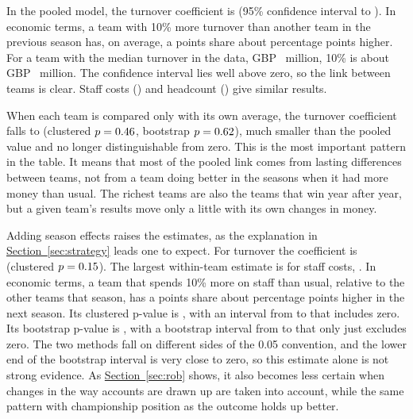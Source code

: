 \documentclass[11pt,a4paper]{article}
\begin{document}
In the pooled model, the turnover coefficient is \CoefTurnPooled{}
(95\% confidence interval \CiLowTurnPooled{} to \CiHighTurnPooled). In economic terms, a team with 10\% more turnover than
another team in the previous season has, on average, a points share about \PpTurnPooled{} percentage points higher. For a
team with the median turnover in the data, GBP~\MedTurnM{} million, 10\% is about GBP~\TenPctTurnM{} million.
The confidence interval lies well above zero, so the link between teams is clear. Staff costs (\CoefStaffPooled) and
headcount (\CoefHeadPooled) give similar results.

When each team is compared only with its own average,
the turnover coefficient falls to \CoefTurnFe{} (clustered $p = 0.46$, bootstrap $p = 0.62$), much smaller than
the pooled value and no longer distinguishable from zero. This is the most important pattern in the table. It
means that most of the pooled link comes from lasting differences between teams, not from a team doing better in the
seasons when it had more money than usual. The richest teams are also the teams that win year after year, but a given
team's results move only a little with its own changes in money.

Adding season effects raises the estimates, as the
explanation in \hyperref[sec:strategy]{Section~\ref*{sec:strategy}} leads one to expect. For turnover the coefficient is
\CoefTurnTwfe{} (clustered $p = 0.15$). The largest within-team estimate is for staff costs, \CoefStaffTwfe. In
economic terms, a team that spends 10\% more on staff than usual, relative to the other teams that season, has a points
share about \PpStaffTwfe{} percentage points higher in the next season. Its clustered p-value is \PStaffTwfe{}, with an interval from \CiLowStaffTwfe{} to \CiHighStaffTwfe{} that includes zero.
Its bootstrap p-value is \PwildStaffTwfe{}, with a bootstrap interval from \CiBootLowStaffTwfe{} to \CiBootHighStaffTwfe{}
that only just excludes zero. The two methods fall on different sides of the 0.05 convention, and the lower end of the
bootstrap interval is very close to zero, so this estimate alone is not strong evidence. As
\hyperref[sec:rob]{Section~\ref*{sec:rob}} shows, it also becomes less certain when changes in the way accounts are drawn up
are taken into account, while the same pattern with championship position as the outcome holds up better.
\end{document}

